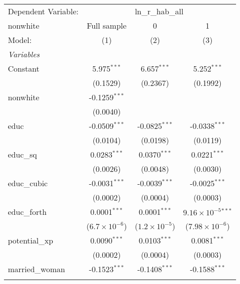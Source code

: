 
\begingroup
\centering
\begin{tabular}{lccc}
   \tabularnewline \midrule \midrule
   Dependent Variable: & \multicolumn{3}{c}{ln\_r\_hab\_all}\\
   nonwhite                        & Full sample            & 0                      & 1 \\   
   Model:                          & (1)                    & (2)                    & (3)\\  
   \midrule
   \emph{Variables}\\
   Constant                        & 5.975$^{***}$          & 6.657$^{***}$          & 5.252$^{***}$\\   
                                   & (0.1529)               & (0.2367)               & (0.1992)\\   
   nonwhite                        & -0.1259$^{***}$        &                        &   \\   
                                   & (0.0040)               &                        &   \\   
   educ                            & -0.0509$^{***}$        & -0.0825$^{***}$        & -0.0338$^{***}$\\   
                                   & (0.0104)               & (0.0198)               & (0.0119)\\   
   educ\_sq                        & 0.0283$^{***}$         & 0.0370$^{***}$         & 0.0221$^{***}$\\   
                                   & (0.0026)               & (0.0048)               & (0.0030)\\   
   educ\_cubic                     & -0.0031$^{***}$        & -0.0039$^{***}$        & -0.0025$^{***}$\\   
                                   & (0.0002)               & (0.0004)               & (0.0003)\\   
   educ\_forth                     & 0.0001$^{***}$         & 0.0001$^{***}$         & $9.16\times 10^{-5}$$^{***}$\\    
                                   & ($6.7\times 10^{-6}$)  & ($1.2\times 10^{-5}$)  & ($7.98\times 10^{-6}$)\\    
   potential\_xp                   & 0.0090$^{***}$         & 0.0103$^{***}$         & 0.0081$^{***}$\\   
                                   & (0.0002)               & (0.0004)               & (0.0003)\\   
   married\_woman                  & -0.1523$^{***}$        & -0.1408$^{***}$        & -0.1588$^{***}$\\   
$$
\end{tabular}

